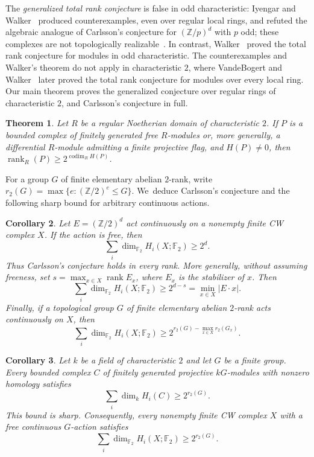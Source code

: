 \documentclass[11pt,reqno]{amsart}
\theoremstyle{plain}
\newtheorem{thmintro}{Theorem}
\newtheorem{corintro}[thmintro]{Corollary}
\theoremstyle{definition}
\DeclareMathOperator{\rank}{rank}
\DeclareMathOperator{\codim}{codim}
\newcommand{\Ff}{\mathbb{F}}
\newcommand{\Z}{\mathbb{Z}}
\begin{document}
The \emph{generalized total rank conjecture} is false in odd characteristic:
Iyengar and Walker~\cite{IyengarWalker} produced counterexamples, even over regular local rings,
and refuted the algebraic analogue of Carlsson's conjecture for $(\Z/p)^d$ with $p$ odd; these
complexes are not topologically realizable~\cite{RupingStephan}.  In contrast,
Walker~\cite{Walker} proved the total rank conjecture for modules in odd characteristic.  The
counterexamples and Walker's theorem do not apply in characteristic $2$, where VandeBogert and
Walker~\cite{VW} later proved the total rank conjecture for modules over every local ring.  Our main
theorem proves the generalized conjecture over regular rings of characteristic $2$, and Carlsson's
conjecture in full.

\begin{thmintro}\label{cor:TRC}
Let $R$ be a regular Noetherian domain of characteristic $2$.  If $P$ is a bounded complex of
finitely generated free $R$-modules or, more generally, a differential $R$-module admitting a
finite projective flag, and $H(P)\ne0$, then $\rank_R(P)\ge 2^{\codim_R H(P)}$.
\end{thmintro}

For a group $G$ of finite elementary abelian $2$-rank, write
$r_2(G)=\max\{e:(\Z/2)^e\le G\}$.  We~deduce Carlsson's conjecture and the following sharp bound
for arbitrary continuous actions.

\begin{corintro}\label{cor:orbits}
Let $E=(\Z/2)^d$ act continuously on a nonempty finite CW complex $X$.  If the action is free, then
\[
 \sum_i\dim_{\Ff_2}H_i(X;\Ff_2)\ge2^d.
\]
Thus Carlsson's conjecture holds in every rank.  More generally, without assuming
freeness, set $s=\max_{x\in X}\rank E_x$, where $E_x$ is the stabilizer of $x$.  Then
\[
 \sum_i\dim_{\Ff_2}H_i(X;\Ff_2)\ge2^{d-s}=\min_{x\in X}|E\cdot x|.
\]
Finally, if a topological group $G$ of finite elementary abelian $2$-rank acts continuously on $X$, then
\[
 \sum_i\dim_{\Ff_2}H_i(X;\Ff_2)\ge2^{r_2(G)-\max_{x\in X}r_2(G_x)}.
\]
\end{corintro}

\begin{corintro}\label{cor:Carlsson}
Let $k$ be a field of characteristic $2$ and let $G$ be a finite group.  Every bounded complex $C$ of
finitely generated projective $kG$-modules with nonzero homology satisfies
\[
 \sum_i\dim_k H_i(C)\ge2^{r_2(G)}.
\]
This bound is sharp.  Consequently, every nonempty finite CW complex $X$ with a
free continuous $G$-action satisfies
\[
 \sum_i\dim_{\Ff_2}H_i(X;\Ff_2)\ge2^{r_2(G)}.
\]
\end{corintro}
\end{document}
